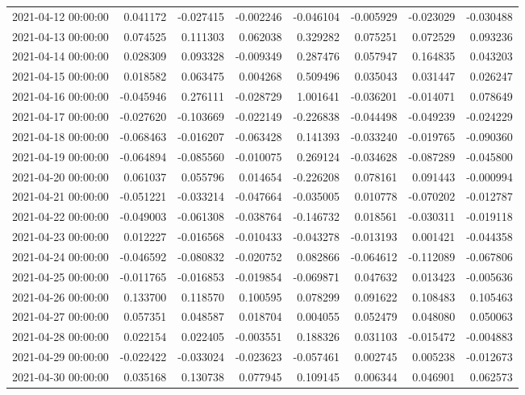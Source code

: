 \begin{tabular}{lrrrrrrr}
2021-04-12 00:00:00 & 0.041172 & -0.027415 & -0.002246 & -0.046104 & -0.005929 & -0.023029 & -0.030488 \\
2021-04-13 00:00:00 & 0.074525 & 0.111303 & 0.062038 & 0.329282 & 0.075251 & 0.072529 & 0.093236 \\
2021-04-14 00:00:00 & 0.028309 & 0.093328 & -0.009349 & 0.287476 & 0.057947 & 0.164835 & 0.043203 \\
2021-04-15 00:00:00 & 0.018582 & 0.063475 & 0.004268 & 0.509496 & 0.035043 & 0.031447 & 0.026247 \\
2021-04-16 00:00:00 & -0.045946 & 0.276111 & -0.028729 & 1.001641 & -0.036201 & -0.014071 & 0.078649 \\
2021-04-17 00:00:00 & -0.027620 & -0.103669 & -0.022149 & -0.226838 & -0.044498 & -0.049239 & -0.024229 \\
2021-04-18 00:00:00 & -0.068463 & -0.016207 & -0.063428 & 0.141393 & -0.033240 & -0.019765 & -0.090360 \\
2021-04-19 00:00:00 & -0.064894 & -0.085560 & -0.010075 & 0.269124 & -0.034628 & -0.087289 & -0.045800 \\
2021-04-20 00:00:00 & 0.061037 & 0.055796 & 0.014654 & -0.226208 & 0.078161 & 0.091443 & -0.000994 \\
2021-04-21 00:00:00 & -0.051221 & -0.033214 & -0.047664 & -0.035005 & 0.010778 & -0.070202 & -0.012787 \\
2021-04-22 00:00:00 & -0.049003 & -0.061308 & -0.038764 & -0.146732 & 0.018561 & -0.030311 & -0.019118 \\
2021-04-23 00:00:00 & 0.012227 & -0.016568 & -0.010433 & -0.043278 & -0.013193 & 0.001421 & -0.044358 \\
2021-04-24 00:00:00 & -0.046592 & -0.080832 & -0.020752 & 0.082866 & -0.064612 & -0.112089 & -0.067806 \\
2021-04-25 00:00:00 & -0.011765 & -0.016853 & -0.019854 & -0.069871 & 0.047632 & 0.013423 & -0.005636 \\
2021-04-26 00:00:00 & 0.133700 & 0.118570 & 0.100595 & 0.078299 & 0.091622 & 0.108483 & 0.105463 \\
2021-04-27 00:00:00 & 0.057351 & 0.048587 & 0.018704 & 0.004055 & 0.052479 & 0.048080 & 0.050063 \\
2021-04-28 00:00:00 & 0.022154 & 0.022405 & -0.003551 & 0.188326 & 0.031103 & -0.015472 & -0.004883 \\
2021-04-29 00:00:00 & -0.022422 & -0.033024 & -0.023623 & -0.057461 & 0.002745 & 0.005238 & -0.012673 \\
2021-04-30 00:00:00 & 0.035168 & 0.130738 & 0.077945 & 0.109145 & 0.006344 & 0.046901 & 0.062573 \\

\end{tabular}
